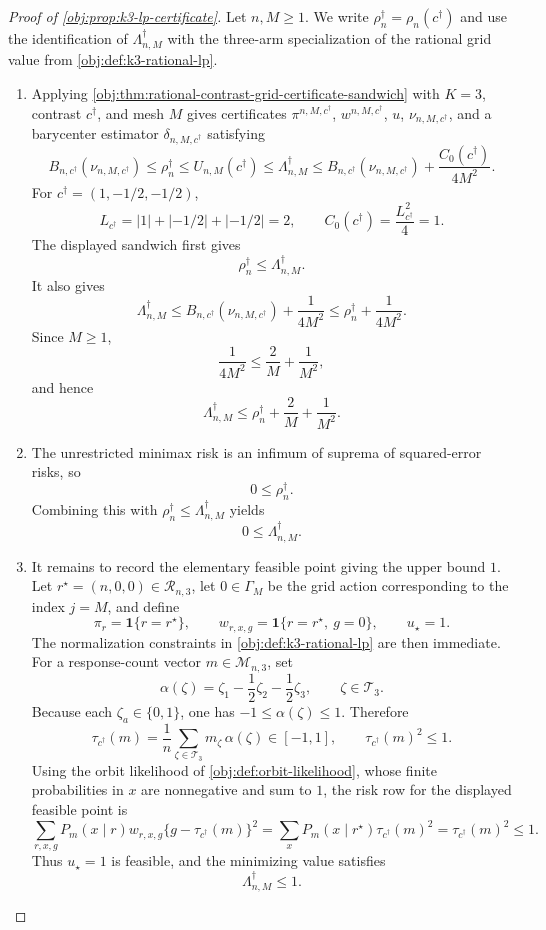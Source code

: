 \begin{proof}[Proof of \cref{obj:prop:k3-lp-certificate}]
Let \(n,M\ge 1\).  We write \(\rho_n^\dagger=\rho_n(c^\dagger)\) and use the identification of \(\Lambda_{n,M}^\dagger\) with the three-arm specialization of the rational grid value from \cref{obj:def:k3-rational-lp}.

\begin{enumerate}
\item Applying \cref{obj:thm:rational-contrast-grid-certificate-sandwich} with \(K=3\), contrast \(c^\dagger\), and mesh \(M\) gives certificates \(\pi^{n,M,c^\dagger}\), \(w^{n,M,c^\dagger}\), \(u\), \(\nu_{n,M,c^\dagger}\), and a barycenter estimator \(\delta_{n,M,c^\dagger}\) satisfying
\[
B_{n,c^\dagger}(\nu_{n,M,c^\dagger})
\le
\rho_n^\dagger
\le
U_{n,M}(c^\dagger)
\le
\Lambda_{n,M}^\dagger
\le
B_{n,c^\dagger}(\nu_{n,M,c^\dagger})
+\frac{C_0(c^\dagger)}{4M^2}.
\]
For \(c^\dagger=(1,-1/2,-1/2)\),
\[
L_{c^\dagger}=|1|+|-1/2|+|-1/2|=2,
\qquad
C_0(c^\dagger)=\frac{L_{c^\dagger}^2}{4}=1 .
\]
The displayed sandwich first gives
\[
\rho_n^\dagger\le \Lambda_{n,M}^\dagger .
\]
It also gives
\[
\Lambda_{n,M}^\dagger
\le
B_{n,c^\dagger}(\nu_{n,M,c^\dagger})+\frac{1}{4M^2}
\le
\rho_n^\dagger+\frac{1}{4M^2}.
\]
Since \(M\ge1\),
\[
\frac{1}{4M^2}\le \frac{2}{M}+\frac{1}{M^2},
\]
and hence
\[
\Lambda_{n,M}^\dagger
\le
\rho_n^\dagger+\frac{2}{M}+\frac{1}{M^2}.
\]

\item The unrestricted minimax risk is an infimum of suprema of squared-error risks, so
\[
0\le \rho_n^\dagger .
\]
Combining this with \(\rho_n^\dagger\le\Lambda_{n,M}^\dagger\) yields
\[
0\le\Lambda_{n,M}^\dagger .
\]

\item It remains to record the elementary feasible point giving the upper bound \(1\).  Let \(r^\star=(n,0,0)\in\mathcal R_{n,3}\), let \(0\in\Gamma_M\) be the grid action corresponding to the index \(j=M\), and define
\[
\pi_r=\mathbf 1\{r=r^\star\},
\qquad
w_{r,x,g}=\mathbf 1\{r=r^\star,\ g=0\},
\qquad
u_\star=1 .
\]
The normalization constraints in \cref{obj:def:k3-rational-lp} are then immediate.  For a response-count vector \(m\in\mathcal M_{n,3}\), set
\[
\alpha(\zeta)=\zeta_1-\frac12\zeta_2-\frac12\zeta_3,
\qquad \zeta\in\mathcal T_3 .
\]
Because each \(\zeta_a\in\{0,1\}\), one has \(-1\le\alpha(\zeta)\le1\).  Therefore
\[
\tau_{c^\dagger}(m)
=
\frac1n\sum_{\zeta\in\mathcal T_3}m_\zeta\,\alpha(\zeta)
\in[-1,1],
\qquad
\tau_{c^\dagger}(m)^2\le1 .
\]
Using the orbit likelihood of \cref{obj:def:orbit-likelihood}, whose finite probabilities in \(x\) are nonnegative and sum to \(1\), the risk row for the displayed feasible point is
\[
\sum_{r,x,g}P_m(x\mid r)w_{r,x,g}
\{g-\tau_{c^\dagger}(m)\}^2
=
\sum_x P_m(x\mid r^\star)\tau_{c^\dagger}(m)^2
=
\tau_{c^\dagger}(m)^2
\le 1 .
\]
Thus \(u_\star=1\) is feasible, and the minimizing value satisfies
\[
\Lambda_{n,M}^\dagger\le1 .
\]


\end{enumerate}
\end{proof}
